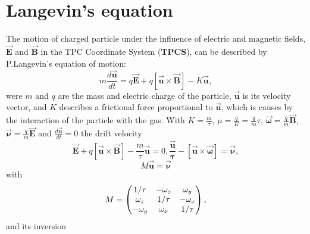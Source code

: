 \documentclass[12pt]{article} %
\begin{document}
\section{Langevin's equation}
\par
The motion of charged particle under the influence of electric and magnetic fields\cite{Blum},  $\mathbf{\overrightarrow{E}}$ and 
$\overrightarrow{\mathbf{B}}$ in the TPC Coordinate System ({\bf TPCS}),  can be described by P.Langevin's equation of motion:
\begin{equation}
   m \frac{d\overrightarrow{\mathbf{u}}}{dt} = q \overrightarrow{\mathbf{E}} + q [ \overrightarrow{\mathbf{u}} \times \overrightarrow{\mathbf{B}} ] - K \overrightarrow{\mathbf{u}},
\end{equation} 
were $m$ and $q$ are the mass and electric charge of the particle, 
$\overrightarrow{\mathbf{u}}$ is its velocity vector,  
and  $K$ describes a frictional force  proportional to  $\overrightarrow{\mathbf{u}}$, 
which is causes by the interaction of the particle with the gas.
With $K = \frac{m}{\tau}$, $\mu = \frac{q}{K} = \frac{q}{m} \tau$, 
$\overrightarrow{\mathbf{\omega}} = \frac{q}{m} \overrightarrow{\mathbf{B}}$, 
$\overrightarrow{\mathbf{\nu}} = \frac{q}{m} \overrightarrow{\mathbf{E}}$  and $ \frac{d\overrightarrow{\mathbf{u}}}{dt}  = 0 $ the drift velocity
\begin{equation*}
 \overrightarrow{\mathbf{E}} + q [ \overrightarrow{\mathbf{u}} \times \overrightarrow{\mathbf{B}} ] - \frac{m}{\tau}  \overrightarrow{\mathbf{u}} = 0, 
  \mathbf{\frac{\overrightarrow{u}}{\tau}}  - [\overrightarrow{\mathbf{u}} \times \overrightarrow{\mathbf{\omega}} ] =   \overrightarrow{\mathbf{\nu}},  
\end{equation*}
 \begin{equation*} 
  M \overrightarrow{\mathbf{u}} = \overrightarrow{\mathbf{\nu}} 
\end{equation*} 
with 
\begin{equation*}
M = 
\begin{pmatrix} %
1/\tau           & -\omega_{z} & \omega_{y} \cr
\omega_{z} & 1/\tau            & -\omega_{x} \cr
-\omega_{y}& \omega_{x}  & 1/\tau \cr
\end{pmatrix}
,
\end{equation*}
and its inversion
\end{document}
